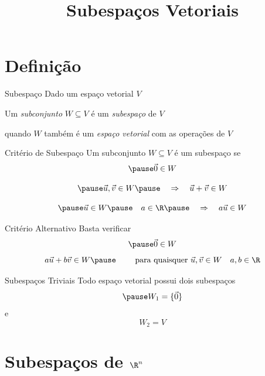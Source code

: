 \documentclass[fleqn,aspectratio=169,12pt]{beamer}
\title{Subespaços Vetoriais}
\begin{document}
\addtitle

\section{Definição}

\begin{frame}{Subespaço}
  Dado um espaço vetorial $V$

  \pause
  \medskip
  Um \emph{subconjunto} $W\subseteq V$
  \pause
  é um \emph{subespaço} de $V$

  \pause
  \medskip
  quando $W$ também é um \emph{espaço vetorial} com as operações de $V$
\end{frame}

\begin{frame}{Critério de Subespaço}
  Um subconjunto $W\subseteq V$ é um subespaço se
  \[
    \pause
    \vec{0}\in W
  \]

  \[
    \pause
    \vec{u}, \vec{v} \in W
    \pause
    \quad\Rightarrow\quad
    \vec{u} + \vec{v} \in W
  \]

  \[
    \pause
    \vec{u} \in W
    \pause
    \quad a \in \R
    \pause
    \quad\Rightarrow\quad
    a\vec{u} \in W
  \]
\end{frame}

\begin{frame}{Critério Alternativo}
  Basta verificar
  \[
    \pause
    \vec{0} \in W
  \]
  \pause
  \[
    a\vec{u}+b\vec{v}\in W
    \pause
    \qquad
    \text{ para quaisquer }
    \vec{u},
    \vec{v}\in W
    \quad
    a, b\in\R
  \]
\end{frame}

\begin{frame}{Subespaços Triviais}
  Todo espaço vetorial possui dois subespaços
  \[
    \pause
    W_1 = \{\vec{0}\}
  \]
  \pause e
  \[
    W_2 = V
  \]
\end{frame}

\section{Subespaços de $\R^n$}
\end{document}
